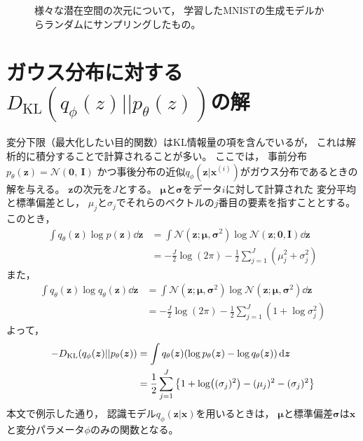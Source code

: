 \documentclass[dvipdfmx, fleqn]{jsarticle}
\begin{document}
\begin{figure}[H]
\begin{minipage}{0.2\linewidth}
        \label{fig:latent_space_20D}
    \end{minipage}
    \caption{
        様々な潜在空間の次元について，
        学習したMNISTの生成モデルからランダムにサンプリングしたもの。
        }
    \label{fig:latent_spaces}
\end{figure}



\section{ガウス分布に対する\(D_\mathrm{KL}(q_{\phi}({z}) || p_{\theta} ({z}))\)の解}

変分下限（最大化したい目的関数）はKL情報量の項を含んでいるが，
これは解析的に積分することで計算されることが多い。
ここでは，
事前分布\(p_{\theta} (\bm{z}) = \mathcal{N} (\bm{0},\ \bm{I})\)
かつ事後分布の近似\(q_{\phi} (\bm{z} | \bm{x}^{(i)})\)がガウス分布であるときの解を与える。
\(\bm{z}\)の次元を\(J\)とする。
\(\bm{\mu}\)と\(\bm{\sigma}\)をデータ\(i\)に対して計算された
変分平均と標準偏差とし，
\(\mu_j\)と\(\sigma_j\)でそれらのベクトルの\(j\)番目の要素を指すこととする。
このとき，
\begin{align*}
    \int q_{\theta} (\bm{z}) \log{p(\bm{z})} \dd{\bm{z}}
        & = \int \mathcal{N} (\bm{z}; \bm{\mu}, \bm{\sigma}^2) \log{\mathcal{N}(\bm{z}; \bm{0}, \bm{I})} \dd{\bm{z}} \\
        & = -\frac{J}{2} \log(2\pi) - \frac{1}{2} \sum_{j=1}^{J} (\mu_j^2 + \sigma_j^2)
\end{align*}
また，
\begin{align*}
    \int q_{\theta} (\bm{z}) \log{q_{\theta} (\bm{z})} \dd{\bm{z}}
        & = \int \mathcal{N} (\bm{z}; \bm{\mu}, \bm{\sigma}^2) \log{\mathcal{N}(\bm{z}; \bm{\mu}, \bm{\sigma}^2)} \dd{\bm{z}} \\
        & = -\frac{J}{2} \log(2\pi) - \frac{1}{2} \sum_{j=1}^{J} (1 + \log{\sigma_j^2})
\end{align*}
よって，
\begin{align*}
    -D_\mathrm{KL}(q_{\phi}(\bm{z}) || p_{\theta} (\bm{z}))
        & = \int q_{\theta} (\bm{z}) \qty(\log{p_{\theta} (\bm{z}) - \log{q_{\theta} (\bm{z})}}) \dd{\bm{z}} \\
        & = \frac{1}{2} \sum_{j=1}^{J} \qty{1 + \log((\sigma_j)^2) - (\mu_j)^2 - (\sigma_j)^2}
\end{align*}
本文で例示した通り，
認識モデル\(q_{\phi} (\bm{z} | \bm{x})\)を用いるときは，
\(\bm{\mu}\)と標準偏差\(\bm{\sigma}\)は\(\bm{x}\)と変分パラメータ\(\phi\)のみの関数となる。
\end{document}
